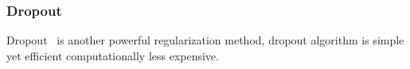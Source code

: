 \subsubsection{Dropout}

Dropout~\cite{JMLR:v15:srivastava14a} is another powerful regularization method, dropout algorithm is simple yet efficient  computationally less expensive. 